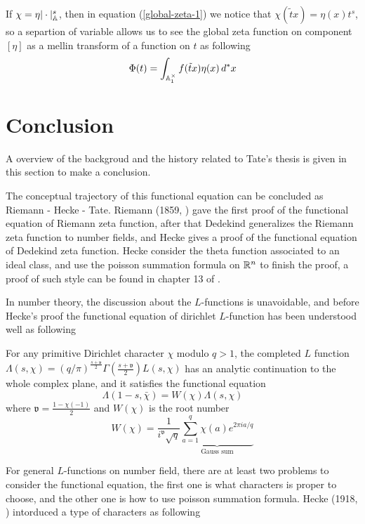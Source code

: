If \(\chi = \eta |\cdot|_{\mathbb{A}}^s\), then in equation (\ref{global-zeta-1}) we notice that \(\chi(\tilde{t}x) = \eta(x)t^s\), so a separtion of variable allows us to see the global zeta function on component \([\eta]\) as a mellin transform of a function on \(t\) as following
\[\Phi(t) = \int_{\mathbb{A}_1^\times} f(\tilde{t}x) \eta(x) \, d^*x\]



\section{Conclusion}

A overview of the backgroud and the history related to Tate's thesis is given in this section to make a conclusion. 

The conceptual trajectory of this functional equation can be concluded as Riemann - Hecke - Tate. Riemann (1859, \cite{Ri}) gave the first proof of the functional equation of Riemann zeta function, after that Dedekind generalizes the Riemann zeta function to number fields, and Hecke \cite{hecke1917zetafunktion} gives a proof of the functional equation of Dedekind zeta function. Hecke consider the theta function associated to an ideal class, and use the poisson summation formula on \(\mathbb{R}^n\) to finish the proof, a proof of such style can be found in chapter 13 of \cite{lang1994algebraic}.

In number theory, the discussion about the \(L\)-functions is unavoidable, and before Hecke's proof the functional equation of dirichlet \(L\)-function has been understood well as following

\begin{theorem}
    For any primitive Dirichlet character \(\chi\) modulo \(q>1\), the completed \(L\) function \(\Lambda(s,\chi) = (q/\pi)^{\frac{s+\mathfrak{v}}{2}}\Gamma(\frac{s+\mathfrak{v}}{2})L(s,\chi)\) has an analytic continuation to the whole complex plane, and it satisfies the functional equation
    \[\Lambda(1-s,\bar{\chi}) = W(\chi) \Lambda(s,\chi) \qquad \] 
    where \(\mathfrak{v} = \frac{1-\chi(-1)}{2}\) and \(W(\chi)\) is the root number
    \[W(\chi) = \frac{1}{i^{\mathfrak{v}}{\sqrt{q}}} \underbrace{\sum_{a=1}^q \chi(a) e^{2 \pi i a /q}}_{\text{ Gauss sum }}  \]
\end{theorem}

For general \(L\)-functions on number field, there are at least two problems to consider the functional equation, the first one is what characters is proper to choose, and the other one is how to use poisson summation formula. Hecke (1918, \cite{hecke1918neue}) intorduced a type of characters as following

